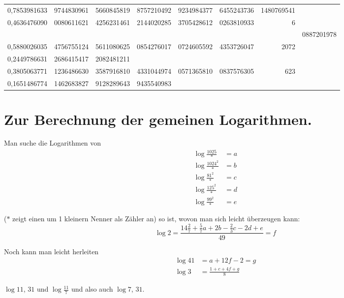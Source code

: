 \documentclass[10pt,a4paper]{article}
\begin{document}
\begin{center}
\begin{tabular}{r r r r r r r r}
0,7853981633 & 9744830961 & 5660845819 & 8757210492 & 9234984377 & 6455243736 & 1480769541 \\
0,4636476090 & 0080611621 & 4256231461 & 2144020285 & 3705428612 & 0263810933 & 6 \\
& & & & & & & 0887201978 \\
0,5880026035 & 4756755124 & 5611080625 & 0854276017 & 0724605592 & 4353726047 & 2072 \\
0,2449786631 & 2686415417 & 2082481211 & & & & \\
0,3805063771 & 1236486630 & 3587916810 & 4331044974 & 0571365810 & 0837576305 & 623 \\
0,1651486774 & 1462683827 & 9128289643 & 9435540983 & & & \\
\end{tabular}
\end{center}

\newpage

\section{Zur Berechnung der gemeinen Logarithmen.}

Man suche die Logarithmen von
\begin{align*}
\log \frac{1025}{*} &= a \\
\log \frac{1024^2}{*} &= b \\
\log \frac{81^2}{*} &= c \\
\log \frac{125^2}{*} &= d \\
\log \frac{99^2}{*} &= e
\end{align*}

($*$ zeigt einen um 1 kleinern Nenner als Z\"ahler an) so ist, wovon man sich
leicht \"uberzeugen kann:
\[
\log 2 = \frac{14\frac{2}{7} + \frac{5}{7}a + 2b - \frac{2}{3}c - 2d + e}{49} = f
\]

Noch kann man leicht herleiten
\begin{align*}
\log 41 &= a + 12f - 2 = g \\
\log 3 &= \frac{1 + c + 4f + g}{8}
\end{align*}

$\log 11$, $31$ und $\log \frac{11}{7}$ und also auch $\log 7$, $31$.

\newpage
\end{document}
